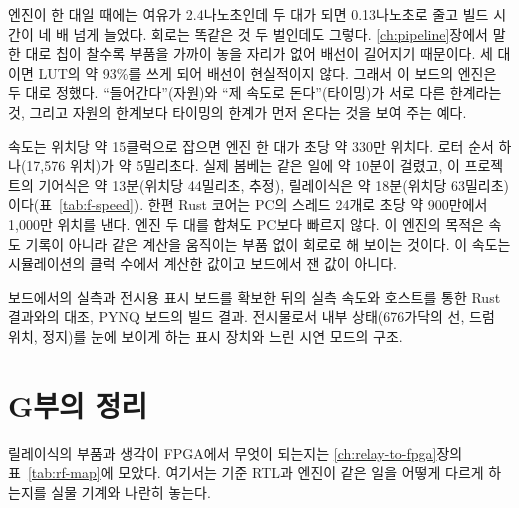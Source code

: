 엔진이 한 대일 때에는 여유가 2.4나노초인데 두 대가 되면 0.13나노초로 줄고 빌드 시간이 네 배 넘게
늘었다. 회로는 똑같은 것 두 벌인데도 그렇다. \ref{ch:pipeline}장에서 말한 대로 칩이 찰수록 부품을 가까이
놓을 자리가 없어 배선이 길어지기 때문이다. 세 대이면 LUT의 약 93\%를 쓰게 되어 배선이 현실적이지 않다.
그래서 이 보드의 엔진은 두 대로 정했다. ``들어간다''(자원)와 ``제 속도로 돈다''(타이밍)가 서로 다른 한계라는
것, 그리고 자원의 한계보다 타이밍의 한계가 먼저 온다는 것을 보여 주는 예다.

속도는 위치당 약 15클럭으로 잡으면 엔진 한 대가 초당 약 330만 위치다. 로터 순서 하나(17,576 위치)가
약 5밀리초다. 실제 봄베는 같은 일에 약 10분이 걸렸고, 이 프로젝트의 기어식은 약 13분(위치당 44밀리초,
추정), 릴레이식은 약 18분(위치당 63밀리초)이다(표~\ref{tab:f-speed}). 한편 Rust 코어는 PC의 스레드 24개로 초당 약
900만에서 1,000만 위치를 낸다. 엔진 두 대를 합쳐도 PC보다 빠르지 않다. 이 엔진의 목적은 속도 기록이 아니라
같은 계산을 움직이는 부품 없이 회로로 해 보이는 것이다. 이 속도는 시뮬레이션의 클럭 수에서 계산한 값이고
보드에서 잰 값이 아니다.

\begin{todobox}{보드에서의 실측과 전시용 표시}
보드를 확보한 뒤의 실측 속도와 호스트를 통한 Rust 결과와의 대조, PYNQ 보드의 빌드 결과. 전시물로서 내부
상태(676가닥의 선, 드럼 위치, 정지)를 눈에 보이게 하는 표시 장치와 느린 시연 모드의 구조.
\end{todobox}

\section{G부의 정리}

릴레이식의 부품과 생각이 FPGA에서 무엇이 되는지는 \ref{ch:relay-to-fpga}장의 표~\ref{tab:rf-map}에 모았다. 여기서는
기준 RTL과 엔진이 같은 일을 어떻게 다르게 하는지를 실물 기계와 나란히 놓는다.

